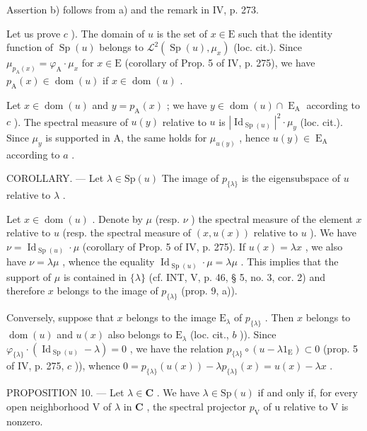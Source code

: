 Assertion b) follows from a) and the remark in IV, p. 273.

Let us prove \(c\) ). The domain of \(u\) is the set of \(x \in \mathrm{E}\) such that the identity function of \(\operatorname{Sp}(u)\) belongs to \(\mathcal{L}^2(\operatorname{Sp}(u), \mu_x)\) (loc. cit.). Since \(\mu_{p_{\mathrm{A}}(x)} = \varphi_{\mathrm{A}} \cdot \mu_x\) for \(x \in \mathrm{E}\) (corollary of Prop. 5 of IV, p. 275), we have \(p_{\mathrm{A}}(x) \in \operatorname{dom}(u)\) if \(x \in \operatorname{dom}(u)\) .

Let \(x \in \operatorname{dom}(u)\) and \(y = p_{\operatorname{A}}(x)\) ; we have \(y \in \operatorname{dom}(u) \cap \operatorname{E}_{\operatorname{A}}\) according to \(c\) ). The spectral measure of \(u(y)\) relative to \(u\) is \(|\operatorname{Id}_{\operatorname{Sp}(u)}|^2 \cdot \mu_y\) (loc. cit.). Since \(\mu_y\) is supported in A, the same holds for \(\mu_{u(y)}\) , hence \(u(y) \in \operatorname{E}_{\operatorname{A}}\) according to \(a\) .

COROLLARY. --- Let \(\lambda \in \mathrm{Sp}(u)\) The image of \(p_{\{\lambda\}}\) is the eigensubspace of \(u\) relative to \(\lambda\) .

Let \(x \in \operatorname{dom}(u)\) . Denote by \(\mu\) (resp. \(\nu\) ) the spectral measure of the element \(x\) relative to \(u\) (resp. the spectral measure of \((x, u(x))\) relative to \(u\) ). We have \(\nu = \operatorname{Id}_{\operatorname{Sp}(u)} \cdot \mu\) (corollary of Prop. 5 of IV, p. 275). If \(u(x) = \lambda x\) , we also have \(\nu = \lambda \mu\) , whence the equality \(\operatorname{Id}_{\operatorname{Sp}(u)} \cdot \mu = \lambda \mu\) . This implies that the support of \(\mu\) is contained in \(\{\lambda\}\) (cf. INT, V, p. 46, § 5, no. 3, cor. 2) and therefore \(x\) belongs to the image of \(p_{\{\lambda\}}\) (prop. 9, a)).

Conversely, suppose that \(x\) belongs to the image \(\mathrm{E}_{\lambda}\) of \(p_{\{\lambda\}}\) . Then \(x\) belongs to \(\operatorname{dom}(u)\) and \(u(x)\) also belongs to \(\mathrm{E}_{\lambda}\) (loc. cit., \(b\) )). Since \(\varphi_{\{\lambda\}} \cdot (\operatorname{Id}_{\operatorname{Sp}(u)} - \lambda) = 0\) , we have the relation \(p_{\{\lambda\}} \circ (u - \lambda 1_{\mathrm{E}}) \subset 0\) (prop. 5 of IV, p. 275, \(c\) )), whence \(0 = p_{\{\lambda\}}(u(x)) - \lambda p_{\{\lambda\}}(x) = u(x) - \lambda x\) .

PROPOSITION 10. — Let \(\lambda \in \mathbf{C}\) . We have \(\lambda \in \mathrm{Sp}(u)\) if and only if, for every open neighborhood V of \(\lambda\) in \(\mathbf{C}\) , the spectral projector \(p_{\mathrm{V}}\) of u relative to V is nonzero.

